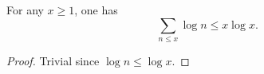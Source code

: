 \begin{lemma}
\label{Mertens-sum-log-le}
\leanok
For any $x \geq 1$, one has
$$ \sum_{n \leq x} \log n \leq x \log x.$$
\end{lemma}
\begin{proof}
\leanok
Trivial since $\log n \leq \log x$.
\end{proof}
